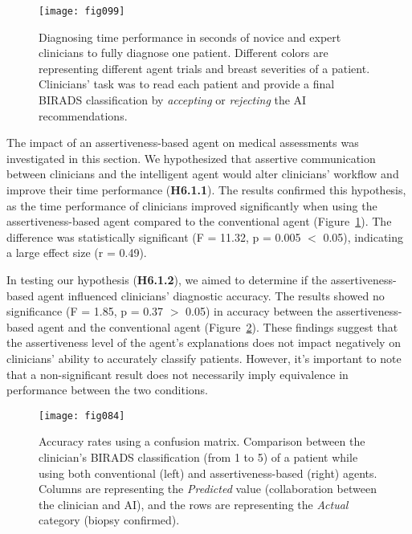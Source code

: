 \begin{figure}[htpb]
\centering
\texttt{[image: fig099]}
\caption[]{Diagnosing time performance in seconds of novice and expert clinicians to fully diagnose one patient. Different colors are representing different agent trials and breast severities of a patient. Clinicians' task was to read each patient and provide a final BIRADS classification by {\it accepting} or {\it rejecting} the AI recommendations.}
\label{fig:fig099}
\end{figure}

The impact of an assertiveness-based agent on medical assessments was investigated in this section.
We hypothesized that assertive communication between clinicians and the intelligent agent would alter clinicians' workflow and improve their time performance ({\bf H6.1.1}).
The results confirmed this hypothesis, as the time performance of clinicians improved significantly when using the assertiveness-based agent compared to the conventional agent (Figure~\ref{fig:fig099}).
The difference was statistically significant (F = 11.32, p = 0.005 $<$ 0.05), indicating a large effect size (r = 0.49).

\textcolor{revised}{In testing our hypothesis (\textbf{H6.1.2}), we aimed to determine if the assertiveness-based agent influenced clinicians' diagnostic accuracy.
The results showed no significance (F = 1.85, p = 0.37 $>$ 0.05) in accuracy between the assertiveness-based agent and the conventional agent (Figure~\ref{fig:fig084}).
These findings suggest that the assertiveness level of the agent's explanations does not impact negatively on clinicians' ability to accurately classify patients.
However, it's important to note that a non-significant result does not necessarily imply equivalence in performance between the two conditions.}

\begin{figure}[htpb]
\centering
\texttt{[image: fig084]}
\caption[]{Accuracy rates using a confusion matrix. Comparison between the clinician's BIRADS classification (from 1 to 5) of a patient while using both conventional (left) and assertiveness-based (right) agents. Columns are representing the {\it Predicted} value (collaboration between the clinician and AI), and the rows are representing the {\it Actual} category (biopsy confirmed).}
\label{fig:fig084}
\end{figure}

